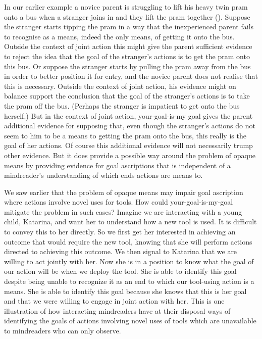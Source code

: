 \documentclass[14pt,a4paper]{extarticle}
\begin{document}
In our earlier example 
a novice parent is struggling to lift his heavy twin pram onto a bus when a stranger joins in and they lift the pram together ().
Suppose the stranger starts tipping the pram in a way that the inexperienced parent fails to recognise as a means, indeed the only means, of getting it onto the bus.
Outside the context of joint action this might give the parent sufficient evidence to reject the idea that the goal of the stranger's actions is to get the pram onto this bus.
Or suppose the stranger starts by pulling the pram away from the bus in order to better position it for entry,
and the novice parent does not realise that this is necessary.
Outside the context of joint action, 
his evidence might on balance support the conclusion that the goal of the stranger's actions is to take the pram off the bus.
(Perhaps the stranger is impatient to get onto the bus herself.)
But in the context of joint action,
your-goal-is-my goal gives the parent  additional evidence for supposing that, 
even though the stranger's actions do not seem to him to be a means to getting the pram onto the bus, 
this really is the goal of her actions.
Of course this additional evidence will not necessarily trump   other evidence.
But it does provide a possible way around the problem of opaque means by providing evidence for goal ascriptions that is independent of a mindreader's understanding of which ends actions are means to.

We saw earlier that the problem of opaque means  may impair goal ascription where actions involve novel uses for tools.
How could your-goal-is-my-goal mitigate the problem in such cases?
Imagine we are interacting with a young child,
Katarina,
and want her to understand how a new tool is used.  
It is difficult to convey this to her directly.  
So we first get her interested in achieving an outcome that would require the new tool,
knowing that she will perform actions directed to achieving this outcome.  
We then signal to Katarina that we are willing to act jointly with her.  
Now she is in a position to know what the goal of our action will be when we deploy the tool.  
She is able to identify this goal 
despite being unable to recognize it as an end to which our tool-using action is a means.
She is able to identify this goal 
because she knows that this is her goal
and that we were willing to engage in joint action with her.
This is one illustration of how 
interacting mindreaders have at their disposal ways of
identifying the goals of actions involving novel uses of tools
which are unavailable to mindreaders who can only observe.
\end{document}
